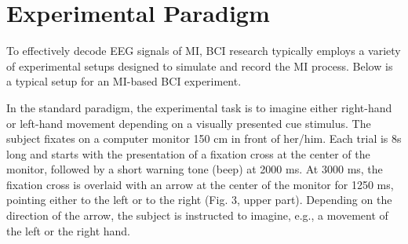 \documentclass[journal,twocolumn]{IEEEtran}
\begin{document}


\section{Experimental Paradigm} \label{sect:conclusion} \cite{pfurtscheller2001motor}

To effectively decode EEG signals of MI, BCI research typically employs a variety of experimental setups designed to simulate and record the MI process. Below is a typical setup for an MI-based BCI experiment.

In the standard paradigm, the experimental task is to imagine either right-hand or left-hand movement depending on a visually presented cue stimulus. The subject fixates on a computer monitor 150 cm in front of her/him. Each trial is 8s long and starts with the presentation of a fixation cross at the center of the monitor, followed by a short warning tone (beep) at 2000 ms. At 3000 ms, the fixation cross is overlaid with an arrow at the center of the monitor for 1250 ms, pointing either to the left or to the right (Fig. 3, upper part). Depending on the direction of the arrow, the subject is instructed to imagine, e.g., a movement of the left or the right hand.
\end{document}
